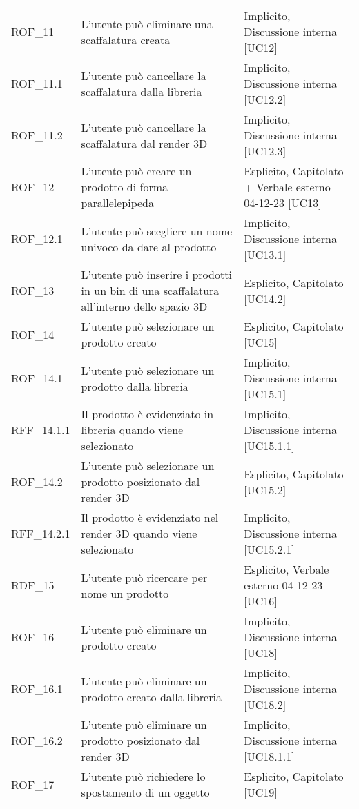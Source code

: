 \begin{xltabular}{\textwidth}{ p{0.1\textwidth} | X | p{0.3\textwidth} }
    ROF\_11 & L'utente può eliminare una scaffalatura creata & Implicito, Discussione interna [UC12]\\
    ROF\_11.1 & L'utente può cancellare la scaffalatura dalla libreria & Implicito, Discussione interna [UC12.2]\\
    ROF\_11.2 & L'utente può cancellare la scaffalatura dal render 3D & Implicito, Discussione interna [UC12.3]\\
    ROF\_12 & L'utente può creare un prodotto di forma parallelepipeda & Esplicito, Capitolato + Verbale esterno 04-12-23 [UC13]\\
    ROF\_12.1 & L'utente può scegliere un nome univoco da dare al prodotto & Implicito, Discussione interna [UC13.1]\\
    ROF\_13 & L'utente può inserire i prodotti in un bin di una scaffalatura all'interno dello spazio 3D & Esplicito, Capitolato [UC14.2]\\
    ROF\_14 & L'utente può selezionare un prodotto creato & Esplicito, Capitolato [UC15]\\
    ROF\_14.1 & L'utente può selezionare un prodotto dalla libreria & Implicito, Discussione interna [UC15.1]\\
    RFF\_14.1.1 & Il prodotto è evidenziato in libreria quando viene selezionato & Implicito, Discussione interna [UC15.1.1]\\
    ROF\_14.2 & L'utente può selezionare un prodotto posizionato dal render 3D & Esplicito, Capitolato [UC15.2]\\
    RFF\_14.2.1 & Il prodotto è evidenziato nel render 3D quando viene selezionato & Implicito, Discussione interna [UC15.2.1]\\
    RDF\_15 & L'utente può ricercare per nome un prodotto & Esplicito, Verbale esterno 04-12-23 [UC16]\\
    ROF\_16 & L'utente può eliminare un prodotto creato & Implicito, Discussione interna [UC18]\\
    ROF\_16.1 & L'utente può eliminare un prodotto creato dalla libreria & Implicito, Discussione interna [UC18.2]\\
    ROF\_16.2 & L'utente può eliminare un prodotto posizionato dal render 3D & Implicito, Discussione interna [UC18.1.1]\\
    ROF\_17 & L'utente può richiedere lo spostamento di un oggetto & Esplicito, Capitolato [UC19]\\

\end{xltabular}
